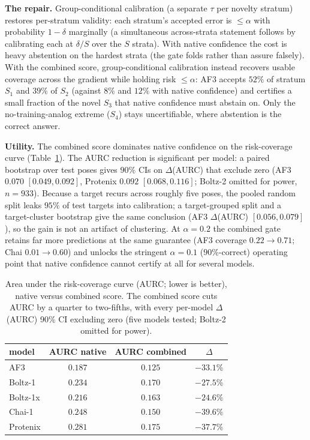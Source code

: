 \documentclass[10pt]{article}
\begin{document}
\textbf{The repair.} Group-conditional calibration (a separate $\tau$ per novelty stratum) restores
per-stratum validity: each stratum's accepted error is $\le\alpha$ with probability $1-\delta$
marginally (a simultaneous across-strata statement follows by calibrating each at $\delta/S$ over the
$S$ strata). With native confidence the cost is heavy abstention on the hardest strata (the gate folds
rather than assure falsely). With the combined score, group-conditional calibration instead recovers
usable coverage across the gradient while holding risk $\le\alpha$: AF3 accepts $52\%$ of stratum $S_1$
and $39\%$ of $S_2$ (against $8\%$ and $12\%$ with native confidence) and certifies a small fraction of
the novel $S_3$ that native confidence must abstain on. Only the no-training-analog extreme ($S_4$)
stays uncertifiable, where abstention is the correct answer.

\textbf{Utility.} The combined score dominates native confidence on the risk-coverage curve
(Table~\ref{tab:aurc}). The AURC reduction is significant per model: a paired bootstrap over test poses
gives $90\%$ CIs on $\Delta$(AURC) that exclude zero (AF3 $0.070$ $[0.049,0.092]$, Protenix $0.092$
$[0.068,0.116]$; Boltz-2 omitted for power, $n=933$). Because a target recurs across roughly five
poses, the pooled random split leaks $95\%$ of test targets into calibration; a target-grouped split
and a target-cluster bootstrap give the same conclusion (AF3 $\Delta$(AURC) $[0.056,0.079]$), so the
gain is not an artifact of clustering. At $\alpha=0.2$ the combined gate retains far more predictions at
the same guarantee (AF3 coverage $0.22\to0.71$; Chai $0.01\to0.60$) and unlocks the stringent
$\alpha=0.1$ ($90\%$-correct) operating point that native confidence cannot certify at all for several
models.

\begin{table}[t]
\centering
\caption{Area under the risk-coverage curve (AURC; lower is better), native versus combined score.
The combined score cuts AURC by a quarter to two-fifths, with every per-model $\Delta$(AURC) 90\% CI
excluding zero (five models tested; Boltz-2 omitted for power).}
\label{tab:aurc}
\begin{tabular}{lccc}
\toprule
model & AURC native & AURC combined & $\Delta$ \\
\midrule
AF3      & $0.187$ & $0.125$ & $-33.1\%$ \\
Boltz-1  & $0.234$ & $0.170$ & $-27.5\%$ \\
Boltz-1x & $0.216$ & $0.163$ & $-24.6\%$ \\
Chai-1   & $0.248$ & $0.150$ & $-39.6\%$ \\
Protenix & $0.281$ & $0.175$ & $-37.7\%$ \\
\bottomrule
\end{tabular}
\end{table}
\end{document}
